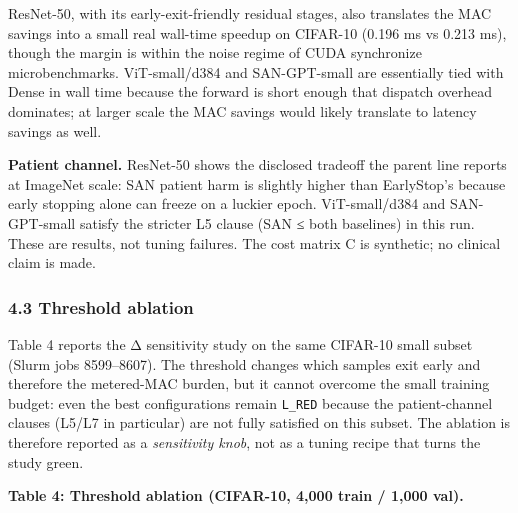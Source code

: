 \documentclass[
]{article}
\begin{document}
ResNet-50, with its early-exit-friendly residual stages, also translates
the MAC savings into a small real wall-time speedup on CIFAR-10 (0.196
ms vs 0.213 ms), though the margin is within the noise regime of CUDA
synchronize microbenchmarks. ViT-small/d384 and SAN-GPT-small are
essentially tied with Dense in wall time because the forward is short
enough that dispatch overhead dominates; at larger scale the MAC savings
would likely translate to latency savings as well.

\textbf{Patient channel.} ResNet-50 shows the disclosed tradeoff the
parent line reports at ImageNet scale: SAN patient harm is slightly
higher than EarlyStop's because early stopping alone can freeze on a
luckier epoch. ViT-small/d384 and SAN-GPT-small satisfy the stricter L5
clause (SAN ≤ both baselines) in this run. These are results, not tuning
failures. The cost matrix C is synthetic; no clinical claim is made.

\hypertarget{threshold-ablation}{%
\subsubsection{4.3 Threshold ablation}\label{threshold-ablation}}

Table 4 reports the Δ sensitivity study on the same CIFAR-10 small
subset (Slurm jobs 8599--8607). The threshold changes which samples exit
early and therefore the metered-MAC burden, but it cannot overcome the
small training budget: even the best configurations remain
\texttt{L\_RED} because the patient-channel clauses (L5/L7 in
particular) are not fully satisfied on this subset. The ablation is
therefore reported as a \emph{sensitivity knob}, not as a tuning recipe
that turns the study green.

\textbf{Table 4: Threshold ablation (CIFAR-10, 4,000 train / 1,000
val).}
\end{document}
